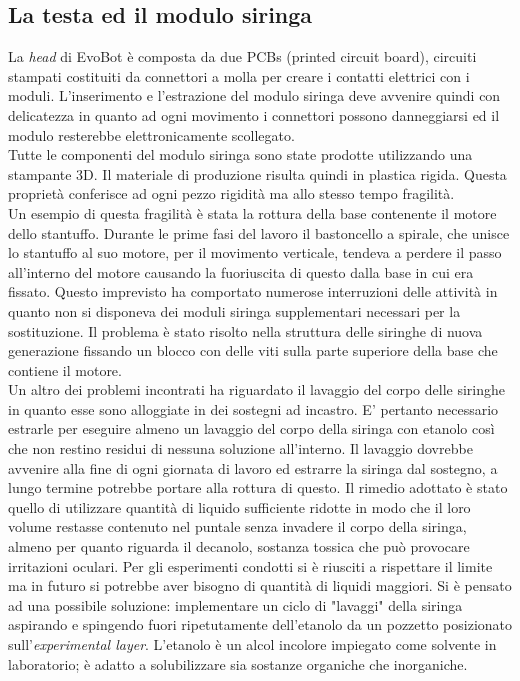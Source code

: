 \subsection{La testa ed il modulo siringa}
La \emph{head} di EvoBot è composta da due PCBs (printed circuit board), circuiti stampati costituiti da connettori a molla per creare i contatti elettrici con i moduli. L'inserimento e l'estrazione del modulo siringa deve avvenire quindi con delicatezza in quanto ad ogni movimento i connettori possono danneggiarsi ed il modulo resterebbe elettronicamente scollegato.
\\Tutte le componenti del modulo siringa sono state prodotte utilizzando una stampante 3D. Il materiale di produzione risulta quindi in plastica rigida. Questa proprietà conferisce ad ogni pezzo rigidità ma allo stesso tempo fragilità.
\\Un esempio di questa fragilità è stata la rottura della base contenente il motore dello stantuffo. Durante le prime fasi del lavoro il bastoncello a spirale, che unisce lo stantuffo al suo motore, per il movimento verticale, tendeva a perdere il passo all'interno del motore causando la fuoriuscita di questo dalla base in cui era fissato. 
Questo imprevisto ha comportato numerose interruzioni delle attività in quanto non si disponeva dei moduli siringa supplementari necessari per la sostituzione. Il problema è stato risolto nella struttura delle siringhe di nuova generazione fissando un blocco con delle viti sulla parte superiore della base che contiene il motore. 
\\Un altro dei problemi incontrati ha riguardato il lavaggio del corpo delle siringhe in quanto esse sono alloggiate in dei sostegni ad incastro. E’ pertanto necessario estrarle per eseguire almeno un lavaggio del corpo della siringa con etanolo così che non restino residui di nessuna soluzione all'interno. Il lavaggio dovrebbe avvenire alla fine di ogni giornata di lavoro ed estrarre la siringa dal sostegno, a lungo termine potrebbe portare alla rottura di questo. Il rimedio adottato è stato quello di utilizzare quantità di liquido sufficiente ridotte in modo che il loro volume restasse contenuto nel puntale senza invadere il corpo della siringa, almeno per quanto riguarda il decanolo, sostanza tossica che può provocare irritazioni oculari. Per gli esperimenti condotti si è riusciti a rispettare il limite ma in futuro si potrebbe aver bisogno di quantità di liquidi maggiori. Si è pensato ad una possibile soluzione: implementare un ciclo di "lavaggi" della siringa aspirando e spingendo fuori ripetutamente dell'etanolo da un pozzetto posizionato sull'\emph{experimental layer}. L'etanolo è un alcol incolore impiegato come solvente in laboratorio; è adatto a solubilizzare sia sostanze organiche che inorganiche. 

